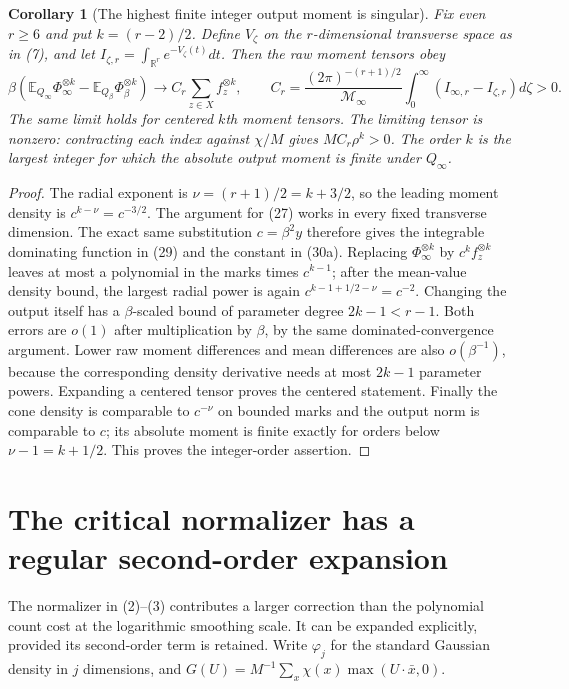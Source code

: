 \documentclass[11pt]{article}
\newtheorem{corollary}[theorem]{Corollary}
\newcommand{\E}{\mathbb E}\newcommand{\R}{\mathbb R}
\begin{document}
\begin{corollary}[The highest finite integer output moment is singular]
Fix even $r\ge6$ and put $k=(r-2)/2$. Define $V_\zeta$ on the
$r$-dimensional transverse space as in (7), and let
$I_{\zeta,r}=\int_{\R^r}e^{-V_\zeta(t)}dt$.
Then the raw moment tensors obey
\[
 \beta\left(\E_{Q_\infty}\Phi_\infty^{\otimes k}
             -\E_{Q_\beta}\Phi_\beta^{\otimes k}\right)
 \longrightarrow C_r\sum_{z\in X}f_z^{\otimes k},\qquad
 C_r=\frac{(2\pi)^{-(r+1)/2}}{\mathcal M_\infty}
                 \int_0^\infty(I_{\infty,r}-I_{\zeta,r})d\zeta>0.
                                                               \tag{30a}
\]
The same limit holds for centered $k$th moment tensors. The limiting
tensor is nonzero: contracting each index against $\chi/M$ gives
$MC_r\rho^k>0$. The order $k$ is the largest integer for which the
absolute output moment is finite under $Q_\infty$.
\end{corollary}
\begin{proof}
The radial exponent is $\nu=(r+1)/2=k+3/2$, so the leading moment
density is $c^{k-\nu}=c^{-3/2}$. The argument for (27) works in every
fixed transverse dimension. The exact same substitution $c=\beta^2y$
therefore gives the integrable dominating function in (29) and the
constant in (30a). Replacing $\Phi_\infty^{\otimes k}$ by
$c^kf_z^{\otimes k}$ leaves at most a polynomial in the marks times
$c^{k-1}$; after the mean-value density bound, the largest radial power
is again $c^{k-1+1/2-\nu}=c^{-2}$. Changing the output itself has a
$\beta$-scaled bound of parameter degree $2k-1<r-1$. Both errors are
$o(1)$ after multiplication by $\beta$, by the same dominated-convergence
argument. Lower raw moment differences and mean differences are also
$o(\beta^{-1})$, because the corresponding density derivative needs
at most $2k-1$ parameter powers. Expanding a centered tensor proves the
centered statement. Finally the cone density is comparable to
$c^{-\nu}$ on bounded marks and the output norm is comparable to $c$;
its absolute moment is finite exactly for orders below
$\nu-1=k+1/2$. This proves the integer-order assertion.
\end{proof}

\section{The critical normalizer has a regular second-order expansion}
The normalizer in (2)--(3) contributes a larger correction than the
polynomial count cost at the logarithmic smoothing scale. It can be
expanded explicitly, provided its second-order term is retained.
Write $\varphi_j$ for the standard Gaussian density in $j$ dimensions,
and $G(U)=M^{-1}\sum_x\chi(x)\max(U\cdot\bar x,0)$.
\end{document}
